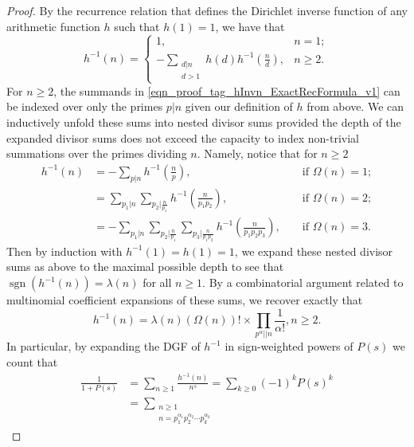 \documentclass[11pt,reqno,a4letter]{article}
\numberwithin{figure}{section}
\numberwithin{table}{section}
\newcommand{\cf}{\textit{cf.\ }}
\theoremstyle{plain}
\numberwithin{theorem}{section}
\theoremstyle{definition}
\begin{document}
\begin{proof}
By the recurrence relation that defines the Dirichlet inverse function of any 
arithmetic function $h$ such that $h(1) = 1$, we have that \cite[\S 2.7]{APOSTOLANUMT} 
\begin{equation} 
\label{eqn_proof_tag_hInvn_ExactRecFormula_v1}
h^{-1}(n) = \begin{cases} 
            1, & n = 1; \\ 
            -\sum\limits_{\substack{d|n \\ d>1}} h(d) h^{-1}\left(\frac{n}{d}\right), & n \geq 2. 
            \end{cases} 
\end{equation} 
For $n \geq 2$, the summands in \eqref{eqn_proof_tag_hInvn_ExactRecFormula_v1} 
can be indexed over only the primes $p|n$ given our definition of $h$ from above. 
We can inductively 
unfold these sums into nested divisor sums provided the depth of the 
expanded divisor sums does not exceed the 
capacity to index non-trivial summations over the primes dividing $n$. 
Namely, notice that for $n \geq 2$ 
\begin{align*} 
h^{-1}(n) & = -\sum_{p|n} h^{-1}\left(\frac{n}{p}\right), && \text{\ if\ } \Omega(n) = 1; \\ 
     & = \sum_{p_1|n} \sum_{p_2|\frac{n}{p_1}} h^{-1}\left(\frac{n}{p_1p_2}\right), && \text{\ if\ } \Omega(n) = 2; \\ 
     & = -\sum_{p_1|n} \sum_{p_2|\frac{n}{p_1}} \sum_{p_3|\frac{n}{p_1p_2}} h^{-1}\left(\frac{n}{p_1p_2p_3}\right), 
     && \text{\ if\ } \Omega(n) = 3. 
\end{align*} 
Then by induction with $h^{-1}(1) = h(1) = 1$, we expand these 
nested divisor sums as above to the maximal possible depth to see that 
$\operatorname{sgn}(h^{-1}(n)) = \lambda(n)$ for all $n \geq 1$. 
By a combinatorial argument related to multinomial coefficient expansions of these sums, 
we recover exactly that \cite[\cf \S 2]{FROBERG-1968} 
\begin{equation} 
\label{eqn_proof_tag_hInvn_ExactNestedSumFormula_CombInterpetIdent_v3} 
h^{-1}(n) = \lambda(n) (\Omega(n))! \times \prod_{p^{\alpha} || n} \frac{1}{\alpha!}, n \geq 2. 
\end{equation} 
In particular, by expanding the DGF of $h^{-1}$ in sign-weighted powers of $P(s)$
we count that 
\begin{align*}
\frac{1}{1+P(s)} & = \sum_{n \geq 1} \frac{h^{-1}(n)}{n^s} = \sum_{k \geq 0} (-1)^k P(s)^k \\ 
     & = 
     \sum_{\substack{n \geq 1 \\ n =p_1^{\alpha_1}p_2^{\alpha_2} \cdots p_k^{\alpha_k}}} 

\end{align*}
\end{proof}
\end{document}
